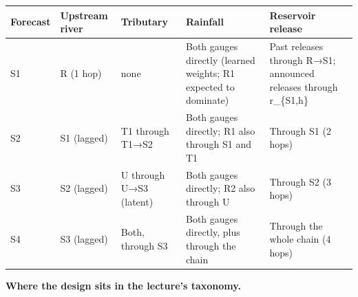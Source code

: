 \documentclass[11pt]{article}
\newcounter{none} %
\begin{document}
{\def\LTcaptype{none} %
\begin{longtable}[]{@{}
  >{\raggedright\arraybackslash}p{}
  >{\raggedright\arraybackslash}p{}
  >{\raggedright\arraybackslash}p{}
  >{\raggedright\arraybackslash}p{}
  >{\raggedright\arraybackslash}p{}@{}}
\toprule\noalign{}
\begin{minipage}[b]{\linewidth}\raggedright
Forecast
\end{minipage} & \begin{minipage}[b]{\linewidth}\raggedright
Upstream river
\end{minipage} & \begin{minipage}[b]{\linewidth}\raggedright
Tributary
\end{minipage} & \begin{minipage}[b]{\linewidth}\raggedright
Rainfall
\end{minipage} & \begin{minipage}[b]{\linewidth}\raggedright
Reservoir release
\end{minipage} \\
\midrule\noalign{}
\endhead
\bottomrule\noalign{}
\endlastfoot
S1 & R (1 hop) & none & Both gauges directly (learned weights; R1 expected to dominate) & Past releases through R→S1; announced releases through r\_\{S1,h\} \\
S2 & S1 (lagged) & T1 through T1→S2 & Both gauges directly; R1 also through S1 and T1 & Through S1 (2 hops) \\
S3 & S2 (lagged) & U through U→S3 (latent) & Both gauges directly; R2 also through U & Through S2 (3 hops) \\
S4 & S3 (lagged) & Both, through S3 & Both gauges directly, plus through the chain & Through the whole chain (4 hops) \\
\end{longtable}
}

\textbf{Where the design sits in the lecture's taxonomy.}
\end{document}
